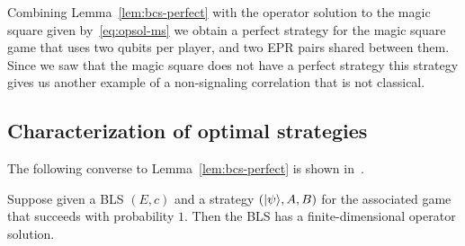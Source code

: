 Combining Lemma~\ref{lem:bcs-perfect} with the operator solution to the magic square given by~\eqref{eq:opsol-ms} we obtain a perfect strategy for the magic square game that uses two qubits per player, and two EPR pairs shared between them. Since we saw that the magic square does not have a perfect strategy this strategy gives us another example of a non-signaling correlation that is not classical. 

\subsection{Characterization of optimal strategies}

The following converse to Lemma~\ref{lem:bcs-perfect} is shown in~\cite{cleve2014characterization}. 

\begin{lemma}\label{lem:bcs-tensor}
Suppose given a BLS $(E,c)$ and a strategy $(|\psi\rangle,A,B)$ for the associated game that succeeds with probability $1$. Then the BLS has a finite-dimensional operator solution. 
\end{lemma}

